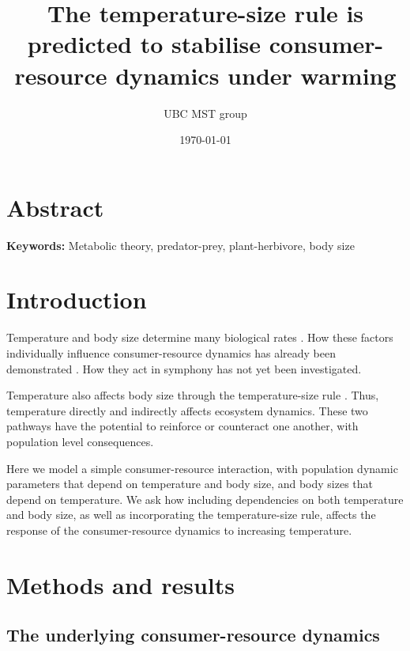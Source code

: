 \documentclass[letter,12pt]{article}
\title{The temperature-size rule is predicted to stabilise consumer-resource dynamics under warming}
\date{\today}
\author{UBC MST group}
\begin{document}
\maketitle
\tableofcontents

\section*{Abstract}

\textbf{Keywords:} Metabolic theory, predator-prey, plant-herbivore, body size

\section{Introduction}

Temperature and body size determine many biological rates \cite{West1997,Gillooly2001}.
How these factors individually influence consumer-resource dynamics has already been demonstrated \cite{Gilbert2014,DeLong2015}.
How they act in symphony has not yet been investigated.

Temperature also affects body size through the temperature-size rule \cite{Atkinson1994}.
Thus, temperature directly and indirectly affects ecosystem dynamics.
These two pathways have the potential to reinforce or counteract one another, with population level consequences.

Here we model a simple consumer-resource interaction, with population dynamic parameters that depend on temperature and body size, and body sizes that depend on temperature.
We ask how including dependencies on both temperature and body size, as well as incorporating the temperature-size rule, affects the response of the consumer-resource dynamics to increasing temperature.

\section{Methods and results}

\subsection{The underlying consumer-resource dynamics}
\end{document}
